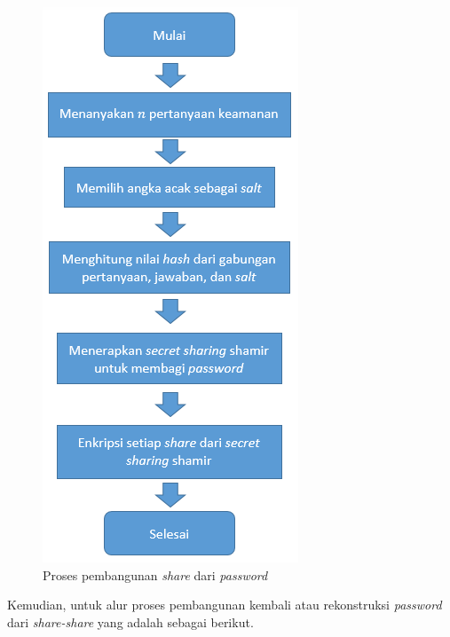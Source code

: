 \begin{figure}[H]
	\centerline{\includegraphics[scale=0.65]{Gambar/flowchart_share}}
	\label{fig:create_share}
	\caption{Proses pembangunan \textit{share} dari \textit{password}}
\end{figure}

Kemudian, untuk alur proses pembangunan kembali atau rekonstruksi \textit{password} dari \textit{share-share} yang adalah sebagai berikut.

